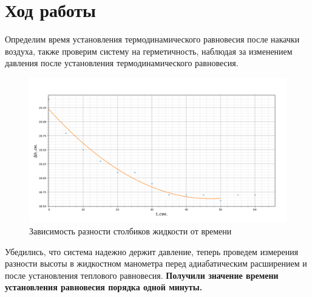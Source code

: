 \documentclass[a4paper, 12pt]{article}%
\begin{document}
	\section{Ход работы}
	Определим время установления термодинамического равновесия после накачки воздуха, также проверим систему на герметичность, наблюдая за изменением давления после установления термодинамического равновесия.
	\begin{figure}[H]
		\centering
		\includegraphics[width=0.82\linewidth]{h_t}
		\caption{Зависимость разности столбиков жидкости от времени}
		\label{fig:ht}
	\end{figure}
	Убедились, что система надежно держит давление, теперь проведем измерения разности высоты в жидкостном манометра перед адиабатическим расширением и после установления теплового равновесия. \textbf{Получили значение времени установления равновесия порядка одной минуты.}
\end{document}
